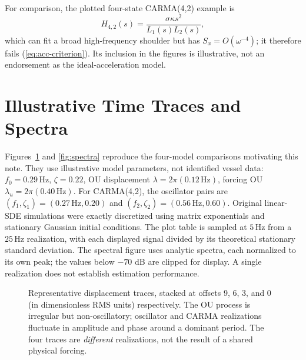 \documentclass[10pt,journal]{IEEEtran}
\newcommand{\PSD}{S_x}
\newcommand{\Hz}{\,\mathrm{Hz}}
\begin{document}
For comparison, the plotted four-state CARMA(4,2) example is
\begin{equation}
H_{4,2}(s)=\frac{\sigma\kappa s^2}{L_1(s)L_2(s)},
\label{eq:42}
\end{equation}
which can fit a broad high-frequency shoulder but has
\(\PSD=O(\omega^{-4})\); it therefore fails
(\ref{eq:acc-criterion}). Its inclusion in the figures is
illustrative, not an endorsement as the ideal-acceleration model.

\section{Illustrative Time Traces and Spectra}
Figures~\ref{fig:time} and \ref{fig:spectra} reproduce the
four-model comparisons motivating this note. They use illustrative
model parameters, not identified vessel data:
\(f_0=0.29\Hz\), \(\zeta=0.22\), OU displacement
\(\lambda=2\pi(0.12\Hz)\), forcing OU
\(\lambda_u=2\pi(0.40\Hz)\). For CARMA(4,2), the
oscillator pairs are \((f_1,\zeta_1)=(0.27\Hz,0.20)\)
and \((f_2,\zeta_2)=(0.56\Hz,0.60)\).
Original linear-SDE simulations were exactly discretized
using matrix exponentials and stationary Gaussian initial conditions.
The plot table is sampled at \(5\Hz\) from a \(25\Hz\)
realization, with each displayed signal divided by its
theoretical stationary standard deviation. The spectral
figure uses analytic spectra, each normalized to its own peak;
the values below \(-70\) dB are clipped for display.
A single realization does not establish estimation performance.

\begin{figure}[t]
\centering
{}
\caption{Representative displacement traces, stacked at offsets
9, 6, 3, and 0 (in dimensionless RMS units) respectively.
The OU process is irregular but non-oscillatory; oscillator and
CARMA realizations fluctuate in amplitude and phase around
a dominant period. The four traces are \emph{different} realizations,
not the result of a shared physical forcing.}
\label{fig:time}
\end{figure}
\end{document}
